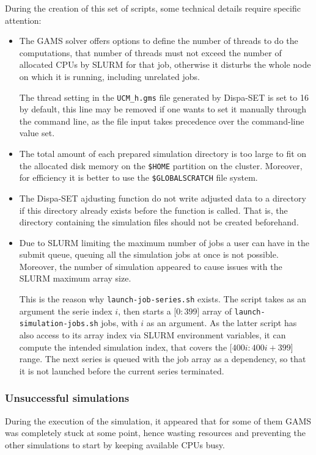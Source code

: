 During the creation of this set of scripts, some technical details require specific attention:
\begin{itemize}
    \item The GAMS solver offers options to define the number of threads to do the computations, that number of threads must not exceed the number of allocated CPUs by SLURM for that job, otherwise it disturbs the whole node on which it is running, including unrelated jobs.
    
    The thread setting in the \texttt{UCM\_h.gms} file generated by Dispa-SET is set to 16 by default, this line may be removed if one wants to set it manually through the command line, as the file input takes precedence over the command-line value set.
    \item The total amount of each prepared simulation directory is too large to fit on the allocated disk memory on the \texttt{\$HOME} partition on the cluster. Moreover, for efficiency it is better to use the \texttt{\$GLOBALSCRATCH} file system.
    \item The Dispa-SET ajdusting function do not write adjusted data to a directory if this directory already exists before the function is called. That is, the directory containing the simulation files should not be created beforehand.
    \item Due to SLURM limiting the maximum number of jobs a user can have in the submit queue, queuing all the simulation jobs at once is not possible. Moreover, the number of simulation appeared to cause issues with the SLURM maximum array size.

    This is the reason why \texttt{launch-job-series.sh} exists. The script takes as an argument the serie index $i$, then starts a [$0:399$] array of \texttt{launch-simulation-jobs.sh} jobs, with $i$ as an argument. As the latter script has also access to its array index via SLURM environment variables, it can compute the intended simulation index, that covers the [$400i:400i+399$] range. The next series is queued with the job array as a dependency, so that it is not launched before the current series terminated.
\end{itemize}

\subsubsection{Unsuccessful simulations}

During the execution of the simulation, it appeared that for some of them GAMS was completely stuck at some point, hence wasting resources and preventing the other simulations to start by keeping available CPUs busy.

